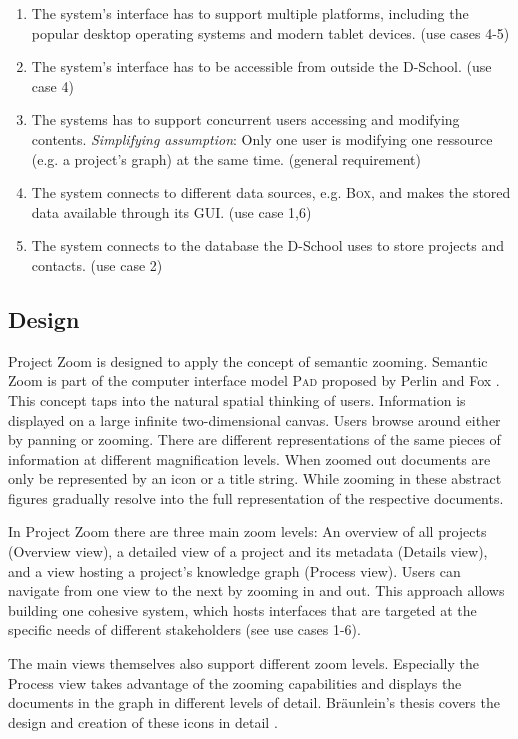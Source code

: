\begin{enumerate}
\item The system's interface has to support multiple platforms, including the popular desktop operating systems and modern tablet devices. (use cases 4-5)
\item The system's interface has to be accessible from outside the D-School. (use case 4) 
\item The systems has to support concurrent users accessing and modifying contents. \textit{Simplifying assumption}: Only one user is modifying one ressource (e.g. a project's graph) at the same time. (general requirement)
\item The system connects to different data sources, e.g. \textsc{Box}, and makes the stored data available through its GUI. (use case 1,6)
\item The system connects to the database the D-School uses to store projects and contacts. (use case 2)

\end{enumerate}

\subsection{Design}

Project Zoom is designed to apply the concept of semantic zooming. Semantic Zoom is part of the computer interface model \textsc{Pad} proposed by Perlin and Fox \cite{Perlin_1993}. This concept taps into the natural spatial thinking of users. Information is displayed on a large infinite two-dimensional canvas. Users browse around either by panning or zooming. There are different representations of the same pieces of information at different magnification levels. When zoomed out documents are only be represented by an icon or a title string. While zooming in these abstract figures gradually resolve into the full representation of the respective documents. 

In Project Zoom there are three main zoom levels: An overview of all projects (Overview view), a detailed view of a project and its metadata (Details view), and a view hosting a project's knowledge graph (Process view). Users can navigate from one view to the next by zooming in and out. This approach allows building one cohesive system, which hosts interfaces that are targeted at the specific needs of different stakeholders (see use cases 1-6).

The main views themselves also support different zoom levels. Especially the Process view takes advantage of the zooming capabilities and displays the documents in the graph in different levels of detail. Bräunlein's thesis covers the design and creation of these icons in detail \cite{Braeunlein_2013}.

